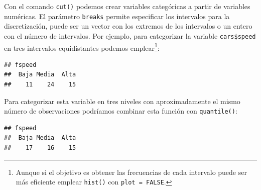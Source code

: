 \documentclass[
]{book}
\newenvironment{Shaded}{\begin{snugshade}}{\end{snugshade}}
\newcommand{\DataTypeTok}[1]{\textcolor[rgb]{0.13,0.29,0.53}{#1}}
\newcommand{\DecValTok}[1]{\textcolor[rgb]{0.00,0.00,0.81}{#1}}
\newcommand{\KeywordTok}[1]{\textcolor[rgb]{0.13,0.29,0.53}{\textbf{#1}}}
\newcommand{\NormalTok}[1]{#1}
\newcommand{\OperatorTok}[1]{\textcolor[rgb]{0.81,0.36,0.00}{\textbf{#1}}}
\newcommand{\StringTok}[1]{\textcolor[rgb]{0.31,0.60,0.02}{#1}}
\begin{document}
Con el comando \texttt{cut()} podemos crear variables categóricas a partir de variables numéricas.
El parámetro \texttt{breaks} permite especificar los intervalos para la discretización, puede ser un vector con los extremos de los intervalos o un entero con el número de intervalos.
Por ejemplo, para categorizar la variable \texttt{cars\$speed} en tres intervalos equidistantes podemos emplear\footnote{Aunque si el objetivo es obtener las frecuencias de cada intervalo puede ser más eficiente emplear \texttt{hist()} con \texttt{plot\ =\ FALSE}.}:

\begin{Shaded}
\end{Shaded}

\begin{verbatim}
## fspeed
##  Baja Media  Alta 
##    11    24    15
\end{verbatim}

Para categorizar esta variable en tres niveles con aproximadamente el mismo número de observaciones podríamos combinar esta función con \texttt{quantile()}:

\begin{Shaded}
\end{Shaded}

\begin{verbatim}
## fspeed
##  Baja Media  Alta 
##    17    16    15
\end{verbatim}
\end{document}
